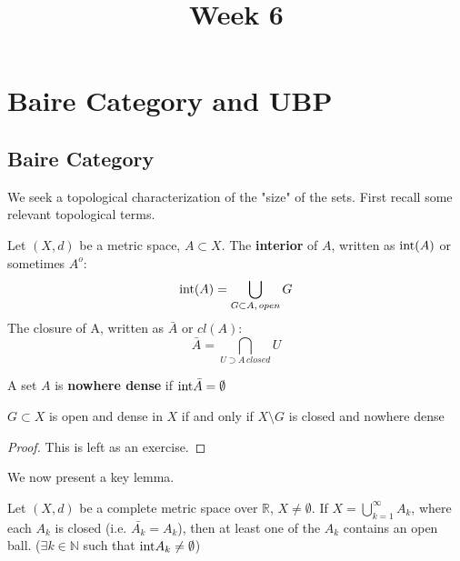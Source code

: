 \documentclass{article}
\title{Week 6}
\begin{document}
\author{\aut}
\maketitle

\section{Baire Category and UBP}

\subsection{Baire Category}

We seek a topological characterization of the "size" of the sets. First recall some relevant topological terms.  

\begin{definition}
    Let $(X,d)$ be a metric space, $A\subset X$.
    The \textbf{interior} of $A$, written as $\textrm{int}(A)$ or sometimes $A^o$:
    $$ \textrm{int}(A)=\bigcup_{G\subset A,\,open}G$$
    The closure of A, written as $\bar{A}$ or $cl(A)$:
    $$ \bar{A}=\bigcap_{U\supset A\,closed}U$$

\end{definition}  

\begin{definition}
    A set $A$ is \textbf{nowhere dense} if $\textrm{int}{\bar{A}}=\emptyset$
\end{definition}

\begin{proposition}
\label{complement of nowhere}
    $G \subset X$ is open and dense in $X$ if and only if $X \setminus G$ is closed and nowhere dense
\end{proposition}   

\begin{proof}
    This is left as an exercise.
\end{proof}


We now present a key lemma.   


\begin{lemma}%
\label{baire lemma}
    Let $(X,d)$ be a complete metric space over $\mathbb{R}$, $X\neq\emptyset$.    
    If $X=\bigcup_{k=1}^\infty A_k$, where each $A_k$ is closed (i.e. $\bar{A_k}=A_k$), then at least one of the $A_k$ contains an open ball. ($\exists k \in \mathbb{N}$ such that $\textrm{int}{A_k}\neq\emptyset$)  
\end{lemma}    
\end{document}
